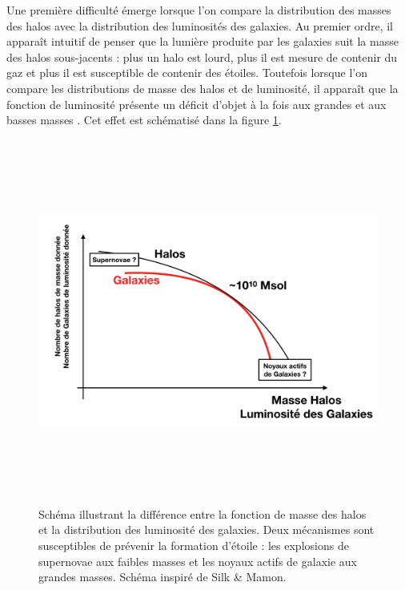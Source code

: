 Une première difficulté émerge lorsque l'on compare la distribution des masses des halos avec la distribution des luminosités des galaxies. Au premier ordre, il apparaît intuitif de penser que la lumière produite par les galaxies suit la masse des halos sous-jacents : plus un halo est lourd, plus il est mesure de contenir du gaz et plus il est susceptible de contenir des étoiles. Toutefois lorsque l'on compare les distributions de masse des halos et de luminosité, il apparaît que la fonction de luminosité présente un déficit d'objet à la fois aux grandes et aux basses masses . Cet effet est schématisé dans la figure \ref{f:silkmamon}.
\begin{figure}[htbp]
	\centering
		\includegraphics[height=12cm]{figs/SilkMamon.png}
	\caption{Schéma illustrant la différence entre la fonction de masse des halos et la distribution des luminosité des galaxies. Deux mécanismes sont susceptibles de prévenir la formation d'étoile : les explosions de supernovae aux faibles masses et les noyaux actifs de galaxie aux grandes masses.  Schéma inspiré de Silk \& Mamon. } 
	\label{f:silkmamon}
\end{figure}
